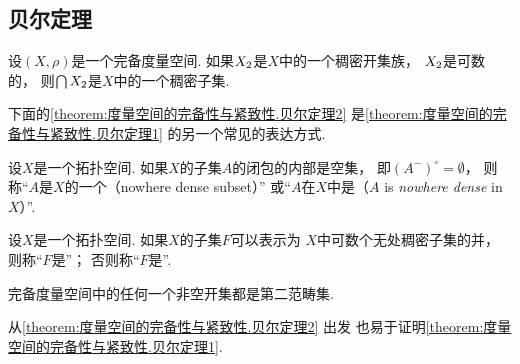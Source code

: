 \subsection{贝尔定理}
\begin{theorem}[贝尔定理]\label{theorem:度量空间的完备性与紧致性.贝尔定理1}
设\((X,\rho)\)是一个完备度量空间.
如果\(X_2\)是\(X\)中的一个稠密开集族，
\(X_2\)是可数的，
则\(\bigcap X_2\)是\(X\)中的一个稠密子集.
\end{theorem}

下面的\cref{theorem:度量空间的完备性与紧致性.贝尔定理2}
是\cref{theorem:度量空间的完备性与紧致性.贝尔定理1} 的另一个常见的表达方式.
\begin{definition}
设\(X\)是一个拓扑空间.
如果\(X\)的子集\(A\)的闭包的内部是空集，
即\((A^-)^\circ = \emptyset\)，
则称“\(A\)是\(X\)的一个（nowhere dense subset）”
或“\(A\)在\(X\)中是（\(A\) is \emph{nowhere dense} in \(X\)）”.
\end{definition}

\begin{definition}
设\(X\)是一个拓扑空间.
如果\(X\)的子集\(F\)可以表示为
\(X\)中可数个无处稠密子集的并，
则称“\(F\)是”；
否则称“\(F\)是”.
\end{definition}

\begin{theorem}[贝尔定理]\label{theorem:度量空间的完备性与紧致性.贝尔定理2}
完备度量空间中的任何一个非空开集都是第二范畴集.
\end{theorem}

从\cref{theorem:度量空间的完备性与紧致性.贝尔定理2} 出发
也易于证明\cref{theorem:度量空间的完备性与紧致性.贝尔定理1}.
